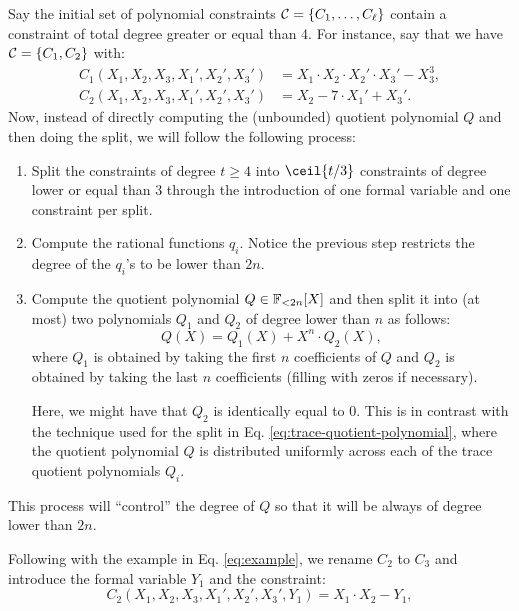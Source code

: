 Say the initial set of polynomial constraints $\mathcal{C} = \{C_1, \dots, C_\ell \}$ contain a constraint of total degree greater or equal than $4$. For instance, say that we have $\mathcal{C} = \{C_1,C_2\}$ with:
\begin{equation}\label{eq:example}
\begin{split}
  C_1(X_1,X_2,X_3,X_1',X_2',X_3') &= X_1 \cdot X_2 \cdot X_2' \cdot X_3' - X_3^3, \\[0.2cm]
  C_2(X_1,X_2,X_3,X_1',X_2',X_3') &= X_2 -7 \cdot X_1' + X_3'.
\end{split}
\end{equation}
Now, instead of directly computing the (unbounded) quotient polynomial $Q$ and then doing the split, we will follow the following process:
\begin{enumerate}
  \item Split the constraints of degree $t \geq 4$ into $\ceil{t/3}$ constraints of degree lower or equal than $3$ through the introduction of one formal variable and one constraint per split.
  \item Compute the rational functions $q_i$. Notice the previous step restricts the degree of the $q_i$'s to be lower than $2n$.
  \item Compute the quotient polynomial $Q \in \mathbb{F}_{<2n}[X]$ and then split it into (at most) two polynomials $Q_1$ and $Q_2$ of degree lower than $n$ as follows:
  \begin{equation}\label{eq:quotient-split}
    Q(X) = Q_1(X) + X^n \cdot Q_2(X),
  \end{equation}
  where $Q_1$ is obtained by taking the first $n$ coefficients of $Q$ and $Q_2$ is obtained by taking the last $n$ coefficients (filling with zeros if necessary).
  \begin{remark}
    Here, we might have that $Q_2$ is identically equal to $0$. This is in contrast with the technique used for the split in Eq. \eqref{eq:trace-quotient-polynomial}, where the quotient polynomial $Q$ is distributed uniformly across each of the trace quotient polynomials $Q_i$.
  \end{remark}
\end{enumerate}
This process will ``control'' the degree of $Q$ so that it will be always of degree lower than $2n$.

Following with the example in Eq. \eqref{eq:example}, we rename $C_2$ to $C_3$ and introduce the formal variable $Y_1$ and the constraint:
\begin{equation}\label{eq:intermediate-constraint}
  C_2(X_1,X_2,X_3,X_1',X_2',X_3',Y_1) = X_1 \cdot X_2 - Y_1,
\end{equation}

